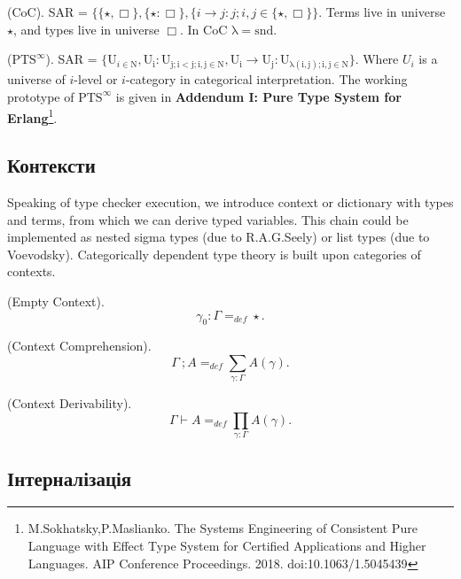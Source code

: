 \begin{example} (CoC). SAR = $\{ \{\star , \Box \},\{ \star : \Box \},
        \{ i \rightarrow j : j; i, j \in \{ \star, \Box \}
        \}$. Terms live in universe $\star$, and types live in universe $\Box$. In CoC $\mathrm{\lambda=snd}$.
\end{example}

\begin{example} ($\mathrm{PTS}^\infty$). SAR = $\{ \mathrm{U}_{i \in \mathrm{N}},
    \mathrm{U_i : U_{j; i < j; i,j \in N}},
    \mathrm{U_i} \rightarrow \mathrm{U_j} : \mathrm{U_{\lambda(i,j); i,j \in \mathrm{N}}}
    \}$. Where $U_i$ is a universe of $i$-level or $i$-category in categorical interpretation.
    The working prototype of $\mathrm{PTS}^\infty$ is given in
    \textbf{Addendum I: Pure Type System for Erlang}\footnote{M.Sokhatsky,P.Maslianko. The Systems Engineering of Consistent Pure Language with Effect Type System for Certified Applications and Higher Languages. AIP Conference Proceedings. 2018.
    doi:10.1063/1.5045439}.
\end{example}

\subsection{Контексти}

Speaking of type checker execution, we introduce context or dictionary with types and terms,
from which we can derive typed variables. This chain could be implemented as
nested sigma types (due to R.A.G.Seely) or list types (due to Voevodsky). Categorically
dependent type theory is built upon categories of contexts.

\begin{definition} (Empty Context).
$$
    \gamma_0 : \Gamma =_{def} \star.
$$
\end{definition}

\begin{definition} (Context Comprehension).
$$
\Gamma\ ; A =_{def} \sum_{\gamma:\Gamma}A(\gamma).
$$
\end{definition}

\begin{definition} (Context Derivability).
$$
\Gamma \vdash A =_{def} \prod_{\gamma:\Gamma}A(\gamma).
$$
\end{definition}

\newpage
\subsection{Інтерналізація}

